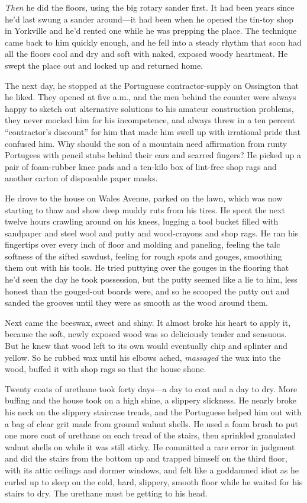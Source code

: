 \documentclass{article}
\begin{document}
\textit{Then} he did the floors, using the big rotary sander first. 
It had been years since he'd last swung a sander around---it had been
when he opened the tin-toy shop in Yorkville and he'd rented one while
he was prepping the place.  The technique came back to him quickly
enough, and he fell into a steady rhythm that soon had all the floors
cool and dry and soft with naked, exposed woody heartmeat.  He swept
the place out and locked up and returned home.

The next day, he stopped at the Portuguese contractor-supply on
Ossington that he liked.  They opened at five a.m., and the men behind
the counter were always happy to sketch out alternative solutions to
his amateur construction problems, they never mocked him for his
incompetence, and always threw in a ten percent ``contractor's
discount'' for him that made him swell up with irrational pride that
confused him.  Why should the son of a mountain need affirmation from
runty Portugees with pencil stubs behind their ears and scarred
fingers?  He picked up a pair of foam-rubber knee pads and a ten-kilo
box of lint-free shop rags and another carton of disposable paper
masks.

He drove to the house on Wales Avenue, parked on the lawn, which was
now starting to thaw and show deep muddy ruts from his tires.  He
spent the next twelve hours crawling around on his knees, lugging a
tool bucket filled with sandpaper and steel wool and putty and
wood-crayons and shop rags.  He ran his fingertips over every inch of
floor and molding and paneling, feeling the talc softness of the
sifted sawdust, feeling for rough spots and gouges, smoothing them out
with his tools.  He tried puttying over the gouges in the flooring
that he'd seen the day he took possession, but the putty seemed like a
lie to him, less honest than the gouged-out boards were, and so he
scooped the putty out and sanded the grooves until they were as smooth
as the wood around them.

Next came the beeswax, sweet and shiny.  It almost broke his heart to
apply it, because the soft, newly exposed wood was so deliciously
tender and sensuous.  But he knew that wood left to its own would
eventually chip and splinter and yellow.  So he rubbed wax until his
elbows ached, \textit{massaged} the wax into the wood, buffed it with
shop rags so that the house shone.

Twenty coats of urethane took forty days---a day to coat and a day to
dry.  More buffing and the house took on a high shine, a slippery
slickness.  He nearly broke his neck on the slippery staircase treads,
and the Portuguese helped him out with a bag of clear grit made from
ground walnut shells.  He used a foam brush to put one more coat of
urethane on each tread of the stairs, then sprinkled granulated walnut
shells on while it was still sticky.  He committed a rare error in
judgment and did the stairs from the bottom up and trapped himself on
the third floor, with its attic ceilings and dormer windows, and felt
like a goddamned idiot as he curled up to sleep on the cold, hard,
slippery, smooth floor while he waited for his stairs to dry.  The
urethane must be getting to his head.
\end{document}
